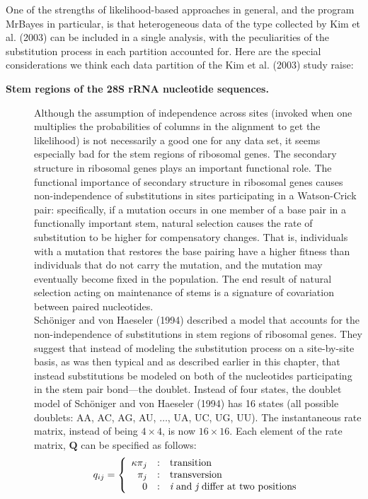 \documentclass{svmult}
\begin{document}
One of the strengths of likelihood-based approaches in general, and the program MrBayes in particular, is that
heterogeneous data of the type collected by Kim et al. (2003) can be included in a single analysis, with the peculiarities of the substitution process in each partition
accounted for. Here are the special considerations we think each data partition of the Kim et al. (2003) study raise:
\begin{description}
\item[ {\bf Stem regions of the 28S rRNA nucleotide sequences.}] Although the assumption of independence across sites (invoked when one multiplies the probabilities
of columns in the alignment to get the likelihood) is not necessarily a good one for any data set, it seems especially bad for the stem regions of ribosomal genes. 
The secondary structure in ribosomal genes plays an important functional role. The functional importance of secondary structure in ribosomal genes causes non-independence
of substitutions in sites participating in a Watson-Crick pair: specifically,  if a mutation occurs in one
member of a base pair in a functionally important stem, natural selection causes the rate of
substitution to be higher for compensatory changes. That is, individuals with
a mutation that restores the base pairing have a higher fitness than individuals
that do not carry the mutation, and the mutation may eventually become
fixed in the population. The end result of natural selection
acting on maintenance of stems is a signature of covariation between paired nucleotides.\\

Sch\"oniger and von Haeseler (1994) described a model that accounts for the non-independence of substitutions in stem regions of ribosomal genes. They
suggest that instead of modeling the substitution process on a site-by-site basis, as was then typical and as described earlier in this chapter, that instead substitutions
be modeled on both of the nucleotides participating in the stem pair bond---the doublet.  Instead of four states, the doublet model of Sch\"oniger and  von Haeseler (1994) has
16 states (all possible doublets: AA, AC, AG, AU, $\ldots$, UA, UC, UG, UU). The instantaneous rate matrix, instead of being $4 \times 4$, is now $16 \times 16$. Each element
of the rate matrix, ${\mathbf Q}$ can be specified as follows:
$$
q_{ij} = \left\{
   \begin{array}{r@{\quad:\quad}l}
      {\kappa \pi}_j & \mbox{transition}                                  \\
      {       \pi}_j & \mbox{transversion}                                \\
      0             & \mbox{{\it i} and {\it j} differ at two positions} \\
   \end{array}
\right.
$$


\end{description}
\end{document}
